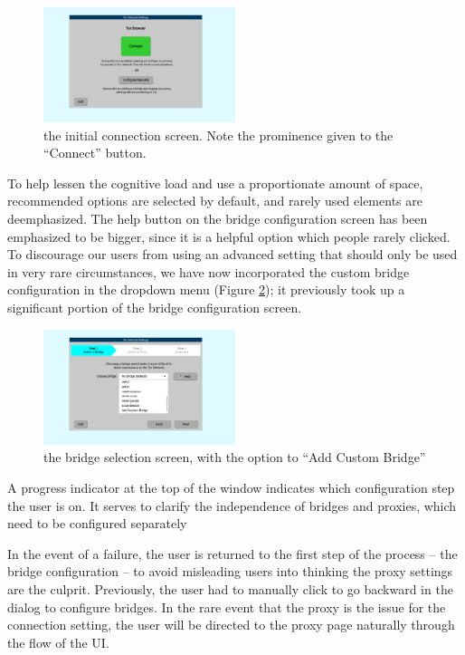 \documentclass{template}
\begin{document}
\begin{figure}[h]
  \centering
    \includegraphics[width=0.5\textwidth]{redesign-firstscreen.png}
    \caption{the initial connection screen. Note the prominence given to the
    ``Connect'' button.}
\label{fig:redesign-firstscreen}
\end{figure}

To help lessen the cognitive load and use a proportionate amount of space,
recommended options are selected by default, and rarely used
elements are deemphasized.
The help button on the bridge configuration screen
has been emphasized to be bigger, since it is a helpful option which people rarely
clicked. To discourage our users from using an advanced setting
that should only be used in very rare circumstances,
we have now incorporated the custom bridge configuration in the dropdown menu
(Figure \ref{fig:redesign-bridges});
it previously took up a significant portion of the bridge configuration screen. 

\begin{figure}[h]
  \centering
    \includegraphics[width=0.5\textwidth]{redesign-bridges.png}
    \caption{the bridge selection screen, with the option to ``Add Custom
    Bridge''}
\label{fig:redesign-bridges}
\end{figure}

A progress indicator at the top of the window indicates which configuration step
the user is on. It serves to clarify the independence of bridges and proxies,
which need to be configured separately

In the event of a failure, the user is
returned to the first step of the process -- the bridge configuration -- to
avoid misleading users into thinking the proxy settings are the culprit. Previously,
the user had to manually click to go backward in the dialog to configure bridges.
In the rare event that the proxy is the issue for the connection setting, the user
will be directed to the proxy page naturally through the flow of the UI. \\
\end{document}

